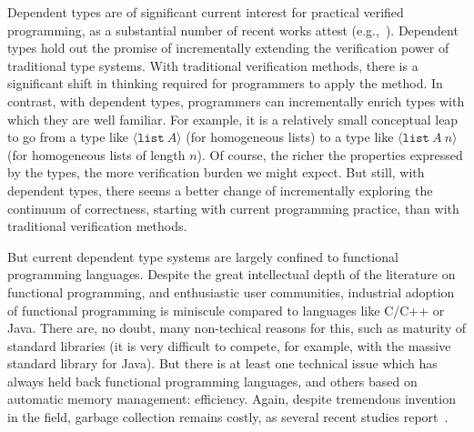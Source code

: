 \documentclass[9pt,natbib]{sigplanconf}
\begin{document}
Dependent types are of significant current interest for practical
verified programming, as a substantial number of recent works attest
(e.g.,~\cite{oury+08,norell07,pasalic+07,sheard06,nanevski+08,licata+05,chenxi05}).
Dependent types hold out the promise of incrementally extending the
verification power of traditional type systems.  With traditional
verification methods, there is a significant shift in thinking
required for programmers to apply the method.
In contrast, with dependent types, programmers can incrementally
enrich types with which they are well familiar.  For example, it is a
relatively small conceptual leap to go from a type like $\langle
\texttt{list}\ A\rangle$ (for homogeneous lists) to a type like
$\langle \texttt{list}\ A\ n\rangle$ (for homogeneous lists of length
$n$).  Of course, the richer the properties expressed by the types,
the more verification burden we might expect.  But still, with
dependent types, there seems a better change of incrementally
exploring the continuum of correctness, starting with current
programming practice, than with traditional verification methods.

But current dependent type systems are largely confined to functional
programming languages.  Despite the great intellectual depth of the
literature on functional programming, and enthusiastic user
communities, industrial adoption of functional programming is
miniscule compared to languages like C/C++ or Java.  There are, no
doubt, many non-techical reasons for this, such as maturity of
standard libraries (it is very difficult to compete, for example, with
the massive standard library for Java).  But there is at least one
technical issue which has always held back functional programming
languages, and others based on automatic memory management:
efficiency.  Again, despite tremendous invention in the field, garbage
collection remains costly, as several recent studies
report~\cite{Xian2008,hertz+05}.
\end{document}
